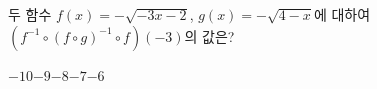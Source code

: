 \hspace*{2mm}\begin{minipage}[t]{\dimexpr\linewidth-2mm\relax}\vspace{0pt}
두 함수 $f(x)=-\sqrt{-3x-2}$, $g(x)=-\sqrt{4-x}$에 대하여 $(f^{-1}\circ(f\circ g)^{-1}\circ f)(-3)$의 값은?
\begin{choices32}{$-10$}{$-9$}{$-8$}{$-7$}{$-6$}\end{choices32}\end{minipage}
